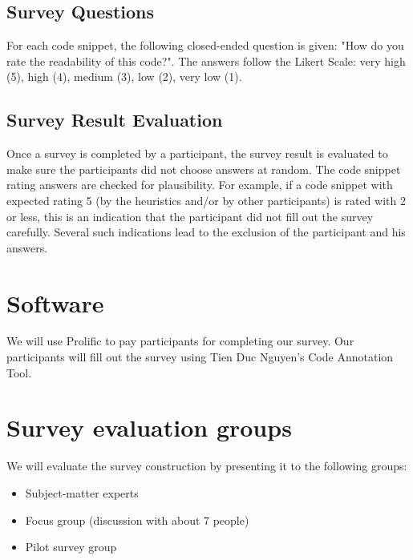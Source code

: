 \documentclass[%
class=scrreprt,
chapterprefix=false,%
open=right,%
twoside=false,%
paper=a4,%
logofile={Logo\_zentral\_farbig\_EN.png},%
thesistype=masterproposal,%
UKenglish,%
]{se2thesis}
\begin{document}
	


\subsection{Survey Questions} %
For each code snippet, the following closed-ended question is given: "How do you rate the readability of this code?". The answers follow the Likert Scale: very high (5), high (4), medium (3), low (2), very low (1).

\subsection{Survey Result Evaluation}
Once a survey is completed by a participant, the survey result is evaluated to make sure the participants did not choose answers at random. The code snippet rating answers are checked for plausibility. For example, if a code snippet with expected rating 5 (by the heuristics and/or by other participants) is rated with 2 or less, this is an indication that the participant did not fill out the survey carefully. Several such indications lead to the exclusion of the participant and his answers.

\section{Software}
We will use Prolific to pay participants for completing our survey. Our participants will fill out the survey using Tien Duc Nguyen's Code Annotation Tool.

\section{Survey evaluation groups} \label{sec:survey-evaluation}
We will evaluate the survey construction by presenting it to the following groups:
\begin{itemize}
	\item Subject-matter experts
	\item Focus group (discussion with about 7 people)
	\item Pilot survey group
\end{itemize}
\end{document}
